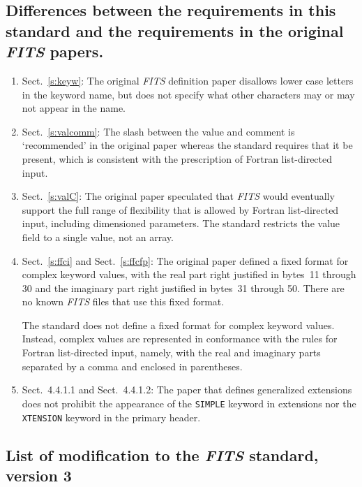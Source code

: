 \documentclass[onecolumn]{aa}
\begin{document}
\subsection{Differences between 
the requirements in this standard 
and the requirements in the original {\em FITS\/} papers.}
\begin{enumerate}

\item Sect.\ \ref{s:keyw}:
The original {\em FITS\/} definition paper \citep{wells81} disallows lower case letters in the keyword name, but does 
not specify what other characters may or may not appear in the name.
 
\item Sect.\ \ref{s:valcomm}:
The slash between the value and comment is `recommended' in the original paper \citep{wells81} whereas 
the standard requires that it be present, which is consistent with the prescription of Fortran list-directed input.
 
\item Sect.\ \ref{s:valC}:
The original paper \citep{wells81} speculated that {\em FITS\/} would eventually support the full
range of flexibility that is allowed by Fortran list-directed input, including dimensioned parameters.
The standard restricts the value field to a single value, not an array.


\item Sect.\ \ref{s:ffci} and Sect.\ \ref{s:ffcfp}:
The original paper \citep{wells81} defined a fixed format for complex keyword values, 
with the real part right justified in bytes~11 through 30 and the
imaginary part right justified in bytes~31 through 50.  There are no known {\em FITS\/} files
that use this fixed format.  

The standard does not define a fixed format for complex keyword 
values.  Instead, complex values are represented in conformance with the rules for
Fortran list-directed input, namely, with the real and imaginary parts separated by a comma and 
enclosed in parentheses.

\item Sect.\  4.4.1.1  and Sect.\  4.4.1.2:
The paper that defines generalized extensions \citep{grosbol88} does not prohibit
the appearance of the {\tt SIMPLE} keyword in extensions nor the {\tt XTENSION}
keyword in the primary header.

\end{enumerate}

\subsection{List of modification to the {\em FITS\/} standard, version 3}
\end{document}
